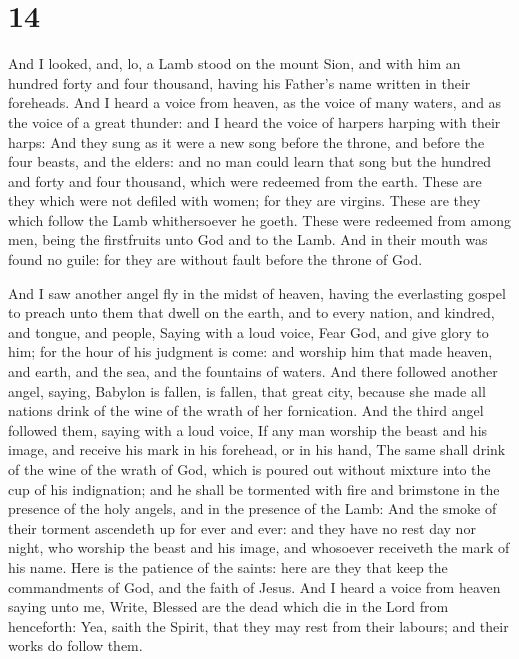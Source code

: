 \hypertarget{section-13}{%
\section{14}\label{section-13}}

 And I looked, and, lo, a Lamb stood on the mount Sion, and
with him an hundred forty and four thousand, having his Father's name
written in their foreheads.  And I heard a voice from
heaven, as the voice of many waters, and as the voice of a great
thunder: and I heard the voice of harpers harping with their harps:
 And they sung as it were a new song before the throne, and
before the four beasts, and the elders: and no man could learn that song
but the hundred and forty and four thousand, which were redeemed from
the earth.  These are they which were not defiled with
women; for they are virgins. These are they which follow the Lamb
whithersoever he goeth. These were redeemed from among men, being the
firstfruits unto God and to the Lamb.  And in their mouth
was found no guile: for they are without fault before the throne of God.

 And I saw another angel fly in the midst of heaven, having
the everlasting gospel to preach unto them that dwell on the earth, and
to every nation, and kindred, and tongue, and people, 
Saying with a loud voice, Fear God, and give glory to him; for the hour
of his judgment is come: and worship him that made heaven, and earth,
and the sea, and the fountains of waters.  And there
followed another angel, saying, Babylon is fallen, is fallen, that great
city, because she made all nations drink of the wine of the wrath of her
fornication.  And the third angel followed them, saying with
a loud voice, If any man worship the beast and his image, and receive
his mark in his forehead, or in his hand,  The same shall
drink of the wine of the wrath of God, which is poured out without
mixture into the cup of his indignation; and he shall be tormented with
fire and brimstone in the presence of the holy angels, and in the
presence of the Lamb:  And the smoke of their torment
ascendeth up for ever and ever: and they have no rest day nor night, who
worship the beast and his image, and whosoever receiveth the mark of his
name.  Here is the patience of the saints: here are they
that keep the commandments of God, and the faith of Jesus. 
And I heard a voice from heaven saying unto me, Write, Blessed are the
dead which die in the Lord from henceforth: Yea, saith the Spirit, that
they may rest from their labours; and their works do follow them.

